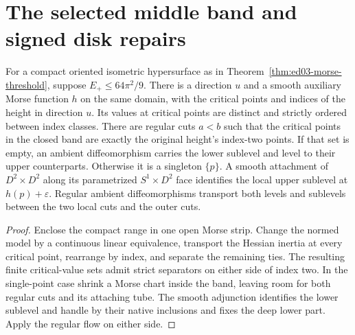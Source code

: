 \section{The selected middle band and signed disk repairs}
\label{sec:ed03-marked-reduction}

\begin{theorem}
\label{thm:ed03-selected-middle-attachment}
\leanok
For a compact oriented isometric hypersurface as in
Theorem~\ref{thm:ed03-morse-threshold}, suppose $E_+\le 64\pi^2/9$.
There is a direction $u$ and a smooth auxiliary Morse function $h$
on the same domain, with the critical points and indices of the
height in direction $u$. Its values at critical points are distinct
and strictly ordered between index classes. There are regular cuts
$a<b$ such that the critical points in the closed band are exactly
the original height's index-two points. If that set is empty, an
ambient diffeomorphism carries the lower sublevel and level to
their upper counterparts. Otherwise it is a singleton $\{p\}$.
A smooth attachment of $D^2\times D^2$ along its parametrized
$S^1\times D^2$ face identifies the local upper sublevel at
$h(p)+\varepsilon$. Regular ambient diffeomorphisms transport both
levels and sublevels between the two local cuts and the outer cuts.
\end{theorem}
\begin{proof}
\leanok
Enclose the compact range in one open Morse strip. Change the
normed model by a continuous linear equivalence, transport the
Hessian inertia at every critical point, rearrange by index, and
separate the remaining ties. The resulting finite critical-value
sets admit strict separators on either side of index two. In the
single-point case shrink a Morse chart inside the band, leaving room
for both regular cuts and its attaching tube. The smooth adjunction
identifies the lower sublevel and handle by their native inclusions
and fixes the deep lower part. Apply the regular flow on either side.
\end{proof}

